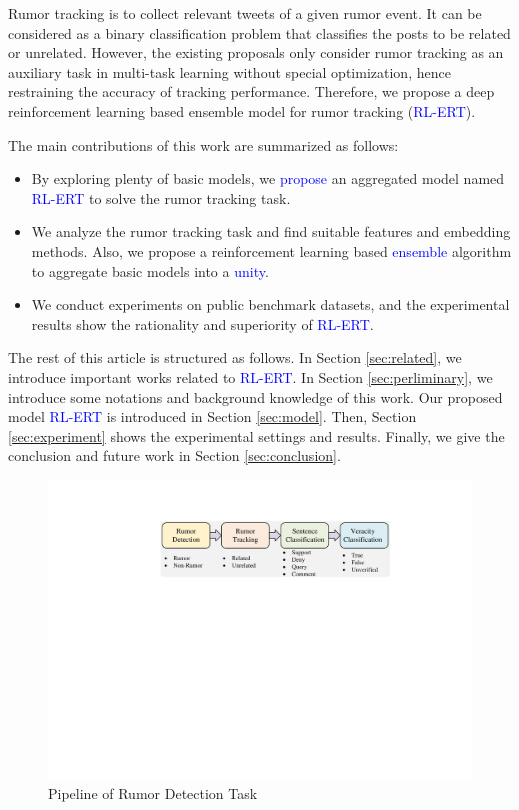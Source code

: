 Rumor tracking is to collect relevant tweets of a given rumor event. It can be considered as a binary classification problem that classifies the posts to be related or unrelated. However, the existing proposals \cite{DBLP:conf/emnlp/QazvinianRRM11, DBLP:conf/www/ChengNB20}  only consider rumor tracking as an auxiliary task in multi-task learning without special optimization, hence restraining the accuracy of tracking performance.
Therefore, we propose a deep reinforcement learning based ensemble model for rumor tracking (\textcolor{blue}{RL-ERT}).

The main contributions of this work are summarized as follows:
\begin{itemize}
	\item By exploring plenty of basic models, we \textcolor{blue}{propose} an aggregated model named \textcolor{blue}{RL-ERT} to solve the rumor tracking task. 
	\item We analyze the rumor tracking task and find suitable features and embedding methods. Also, we propose a reinforcement learning based \textcolor{blue}{ensemble} algorithm to aggregate basic models into a \textcolor{blue}{unity}.
	\item We conduct experiments on public benchmark datasets, and the experimental results show the rationality and superiority of \textcolor{blue}{RL-ERT}.
\end{itemize}

The rest of this article is structured as follows. In Section \ref{sec:related}, we introduce important works related to \textcolor{blue}{RL-ERT}. In Section \ref{sec:perliminary}, we introduce some notations and background knowledge of this work. Our proposed model \textcolor{blue}{RL-ERT} is introduced in Section \ref{sec:model}. Then, Section \ref{sec:experiment} shows the experimental settings and results. Finally, we give the conclusion and future work in Section \ref{sec:conclusion}.

\begin{figure}[tbp]
	\hspace{0ex}
	\vspace{0ex}
	\centering
	\includegraphics[width = \textwidth]{fig/pipeline}
	\caption{Pipeline of Rumor Detection Task}
	\label{fig:pipeline}
\end{figure}